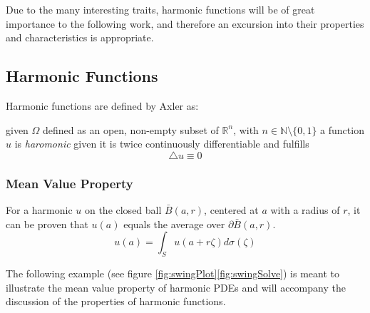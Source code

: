 Due to the many interesting traits, harmonic functions will be of great importance
to the following work, and therefore an excursion into their properties and characteristics
is appropriate. %

\subsection{Harmonic Functions}\label{sssec:harmonics}
Harmonic functions are defined by Axler as:
\begin{definition} given $\Omega$ defined as an open, non-empty subset of
  $\mathbb{R}^{n}$, with $n \in \mathbb{N}\setminus \{0,1\}$
  a function $u$ is \textit{haromonic} given it is twice continuously differentiable
  and fulfills $$ \bigtriangleup u \equiv 0$$
\end{definition}


  \subsubsection{Mean Value Property}\label{sssec:meanvalue}
  For a harmonic $u$ on the closed ball $\bar{B}(a,r)$, centered at $a$ with a radius of $r$,
  it can be proven that $u(a)$ equals the average over $\partial \bar{B}(a,r)$\cite{Axler1992,Bornemann}.
\begin{equation}
  \tag{Mean Value Property}
  u(a) = \int_{S} u(a + r\zeta)d\sigma(\zeta)
  \label{eq:mean}
\end{equation}

The following example (see figure \ref{fig:swingPlot}\ref{fig:swingSolve}) is meant to illustrate
the mean value property of harmonic \Glspl{PDE} and will accompany the discussion
of the properties of harmonic functions.

